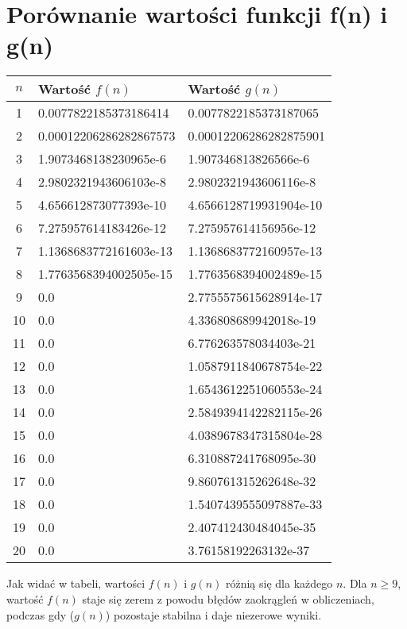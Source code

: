 \documentclass[a4paper,12pt]{article}
\begin{document}
\section{Porównanie wartości funkcji f(n) i g(n)}


\begin{center}
\begin{tabular}{@{}c l l@{}}
\hline
\(n\) & Wartość \(f(n)\) & Wartość \(g(n)\) \\
\hline
1 & 0.0077822185373186414 & 0.0077822185373187065 \\
2 & 0.00012206286282867573 & 0.00012206286282875901 \\
3 & 1.9073468138230965e-6 & 1.907346813826566e-6 \\
4 & 2.9802321943606103e-8 & 2.9802321943606116e-8 \\
5 & 4.656612873077393e-10 & 4.6566128719931904e-10 \\
6 & 7.275957614183426e-12 & 7.275957614156956e-12 \\
7 & 1.1368683772161603e-13 & 1.1368683772160957e-13 \\
8 & 1.7763568394002505e-15 & 1.7763568394002489e-15 \\
9 & 0.0 & 2.7755575615628914e-17 \\
10 & 0.0 & 4.336808689942018e-19 \\
11 & 0.0 & 6.776263578034403e-21 \\
12 & 0.0 & 1.0587911840678754e-22 \\
13 & 0.0 & 1.6543612251060553e-24 \\
14 & 0.0 & 2.5849394142282115e-26 \\
15 & 0.0 & 4.0389678347315804e-28 \\
16 & 0.0 & 6.310887241768095e-30 \\
17 & 0.0 & 9.860761315262648e-32 \\
18 & 0.0 & 1.5407439555097887e-33 \\
19 & 0.0 & 2.407412430484045e-35 \\
20 & 0.0 & 3.76158192263132e-37 \\
\hline
\end{tabular}
\end{center}

Jak widać w tabeli, wartości \(f(n)\) i \(g(n)\) różnią się dla każdego \(n\). Dla \(n \ge 9\), wartość \(f(n)\) staje się zerem z powodu błędów zaokrągleń w obliczeniach, podczas gdy (\(g(n)\)) pozostaje stabilna i daje niezerowe wyniki.

\section{}
\end{document}
